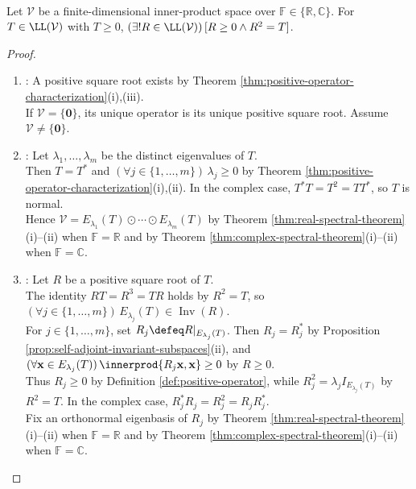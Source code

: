 \begin{proposition} \label{prop:positive-square-root-unique} \\
Let $\mathcal{V}$ be a finite-dimensional inner-product space over $\mathbb{F}\in\{\mathbb{R},\mathbb{C}\}$. For $T\in\LL(\mathcal{V})$ with $T\geq0$, $(\exists!R\in\LL(\mathcal{V}))\,[R\geq0\land R^2=T]$.
\begin{proof}
\begin{enumerate}[label=(\roman*)]
\setlength{\itemsep}{0pt}
\item {}: A positive square root exists by Theorem \ref{thm:positive-operator-characterization}(i),(iii).\\
If $\mathcal{V}=\{\mathbf{0}\}$, its unique operator is its unique positive square root. Assume $\mathcal{V}\neq\{\mathbf{0}\}$.
\item {}: Let $\lambda_1,\ldots,\lambda_m$ be the distinct eigenvalues of $T$.\\
Then $T=T^*$ and $(\forall j\in\{1,\ldots,m\})\,\lambda_j\geq0$ by Theorem \ref{thm:positive-operator-characterization}(i),(ii). In the complex case, $T^*T=T^2=TT^*$, so $T$ is normal.\\
Hence $\mathcal{V}=E_{\lambda_1}(T)\odot\cdots\odot E_{\lambda_m}(T)$ by Theorem \ref{thm:real-spectral-theorem}(i)--(ii) when $\mathbb{F}=\mathbb{R}$ and by Theorem \ref{thm:complex-spectral-theorem}(i)--(ii) when $\mathbb{F}=\mathbb{C}$.
\item {}: Let $R$ be a positive square root of $T$.\\
The identity $RT=R^3=TR$ holds by $R^2=T$, so $(\forall j\in\{1,\ldots,m\})\,E_{\lambda_j}(T)\in\operatorname{Inv}(R)$.\\
For $j\in\{1,\ldots,m\}$, set $R_j\defeq R|_{E_{\lambda_j}(T)}$. Then $R_j=R_j^*$ by Proposition \ref{prop:self-adjoint-invariant-subspaces}(ii), and $(\forall\mathbf{x}\in E_{\lambda_j}(T))\,\innerprod{R_j\mathbf{x},\mathbf{x}}\geq0$ by $R\geq0$.\\
Thus $R_j\geq0$ by Definition \ref{def:positive-operator}, while $R_j^2=\lambda_jI_{E_{\lambda_j}(T)}$ by $R^2=T$. In the complex case, $R_j^*R_j=R_j^2=R_jR_j^*$.\\
Fix an orthonormal eigenbasis of $R_j$ by Theorem \ref{thm:real-spectral-theorem}(i)--(ii) when $\mathbb{F}=\mathbb{R}$ and by Theorem \ref{thm:complex-spectral-theorem}(i)--(ii) when $\mathbb{F}=\mathbb{C}$.\\

\end{enumerate}
\end{proof}
\end{proposition}
